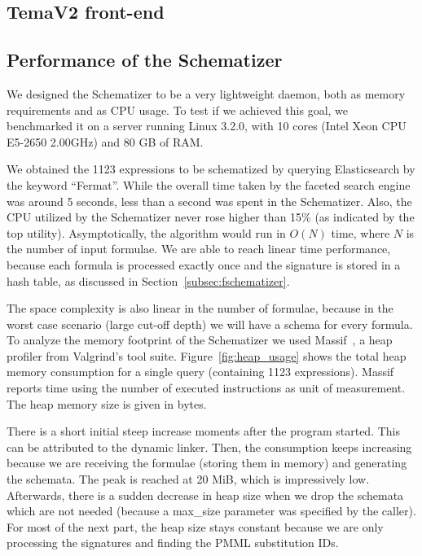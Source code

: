\documentclass[a4paper,oneside]{article}
\begin{document}
\subsection{TemaV2 front-end}\label{subsec:fe_results_display2}

\subsection{Performance of the Schematizer}\label{subsec:sch_performance}
We designed the Schematizer to be a very lightweight daemon, both as memory
requirements and as CPU usage. To test if we achieved this goal, we benchmarked
it on a server running Linux 3.2.0, with 10 cores (Intel Xeon CPU E5-2650
2.00GHz) and 80 GB of RAM. 

We obtained the 1123 expressions to be schematized by querying Elasticsearch by
the keyword ``Fermat''. While the overall time taken by the faceted search
engine was around 5 seconds, less than a second was spent in the Schematizer.
Also, the CPU utilized by the Schematizer never rose higher than 15\% (as
indicated by the \textsf{top} utility). Asymptotically, the algorithm would run
in $O(N)$ time, where $N$ is the number of input formulae. We are able to reach
linear time performance, because each formula is processed exactly once and the
signature is stored in a hash table, as discussed in
Section~\ref{subsec:fschematizer}.

The space complexity is also linear in the number of formulae, because in the
worst case scenario (large cut-off depth) we will have a schema for every
formula. To analyze the memory footprint of the Schematizer we used
Massif~\cite{massif:online}, a heap profiler from Valgrind's tool suite.
Figure~\ref{fig:heap_usage} shows the total heap memory consumption for a
single query (containing 1123 expressions). Massif reports time using the
number of executed instructions as unit of measurement. The heap memory size is
given in bytes.

There is a short initial steep increase moments after the program started.
This can be attributed to the dynamic linker. Then, the consumption keeps
increasing because we are receiving the formulae (storing them in memory) and
generating the schemata. The peak is reached at 20 MiB, which is impressively
low. Afterwards, there is a sudden decrease in heap size when we drop the
schemata which are not needed (because a \textsf{max\_size} parameter was
specified by the caller). For most of the next part, the heap size stays
constant because we are only processing the signatures and finding the PMML
substitution IDs.
\end{document}
